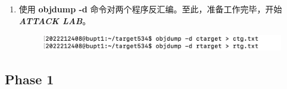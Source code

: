 \begin{enumerate}
\begin{itemize}
            \end{itemize}
            \item 使用 \textbf{objdump -d} 命令对两个程序反汇编。至此，准备工作完毕，开始 \textbf{\textit{ATTACK LAB}}。
                \begin{figure}[htbp]
                    \hspace*{1.5cm}
                    \includegraphics*[width = 12cm]{s0_1.png}
                \end{figure}
        \end{enumerate}
    
    \subsection{Phase 1}
